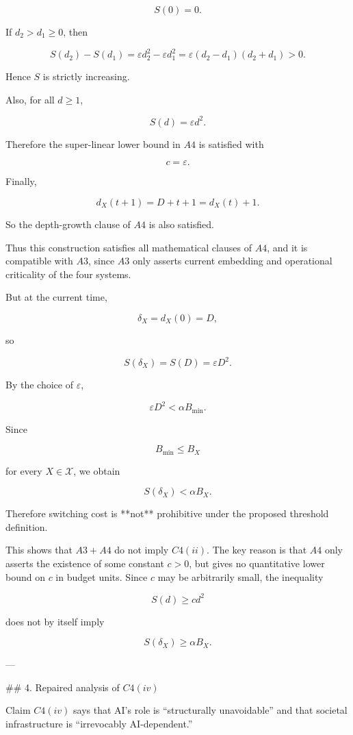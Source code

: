 \[
S(0)=0.
\]

If \(d_2>d_1\ge 0\), then

\[
S(d_2)-S(d_1)
=
\varepsilon d_2^2-\varepsilon d_1^2
=
\varepsilon(d_2-d_1)(d_2+d_1)>0.
\]

Hence \(S\) is strictly increasing.

Also, for all \(d\ge 1\),

\[
S(d)=\varepsilon d^2.
\]

Therefore the super-linear lower bound in \(A4\) is satisfied with

\[
c=\varepsilon.
\]

Finally,

\[
d_X(t+1)=D+t+1=d_X(t)+1.
\]

So the depth-growth clause of \(A4\) is also satisfied.

Thus this construction satisfies all mathematical clauses of \(A4\), and it is compatible with \(A3\), since \(A3\) only asserts current embedding and operational criticality of the four systems.

But at the current time,

\[
\delta_X=d_X(0)=D,
\]

so

\[
S(\delta_X)=S(D)=\varepsilon D^2.
\]

By the choice of \(\varepsilon\),

\[
\varepsilon D^2<\alpha B_{\min}.
\]

Since

\[
B_{\min}\le B_X
\]

for every \(X\in\mathcal X\), we obtain

\[
S(\delta_X)<\alpha B_X.
\]

Therefore switching cost is **not** prohibitive under the proposed threshold definition.

This shows that \(A3+A4\) do not imply \(C4(ii)\). The key reason is that \(A4\) only asserts the existence of some constant \(c>0\), but gives no quantitative lower bound on \(c\) in budget units. Since \(c\) may be arbitrarily small, the inequality

\[
S(d)\ge c d^2
\]

does not by itself imply

\[
S(\delta_X)\ge \alpha B_X.
\]

---

## 4. Repaired analysis of \(C4(iv)\)

Claim \(C4(iv)\) says that AI’s role is “structurally unavoidable” and that societal infrastructure is “irrevocably AI-dependent.”

